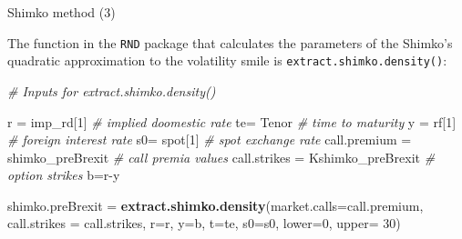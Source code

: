 \documentclass[ignorenonframetext,aspectratio=169]{beamer}
\newenvironment{Shaded}{}{}
\newcommand{\KeywordTok}[1]{\textcolor[rgb]{0.00,0.44,0.13}{\textbf{#1}}}
\newcommand{\DataTypeTok}[1]{\textcolor[rgb]{0.56,0.13,0.00}{#1}}
\newcommand{\DecValTok}[1]{\textcolor[rgb]{0.25,0.63,0.44}{#1}}
\newcommand{\StringTok}[1]{\textcolor[rgb]{0.25,0.44,0.63}{#1}}
\newcommand{\CommentTok}[1]{\textcolor[rgb]{0.38,0.63,0.69}{\textit{#1}}}
\newcommand{\OperatorTok}[1]{\textcolor[rgb]{0.40,0.40,0.40}{#1}}
\newcommand{\NormalTok}[1]{#1}
\begin{document}
\begin{frame}[fragile]{Shimko method (3)}

The function in the \texttt{RND} package that calculates the parameters
of the Shimko's quadratic approximation to the volatility smile is
\texttt{extract.shimko.density()}:

\begin{Shaded}
\begin{Highlighting}[]
\CommentTok{# Inputs for extract.shimko.density()}

\NormalTok{r =}\StringTok{ }\NormalTok{imp_rd[}\DecValTok{1}\NormalTok{]                      }\CommentTok{# implied doomestic rate}
\NormalTok{te=}\StringTok{ }\NormalTok{Tenor                          }\CommentTok{# time to  maturity}
\NormalTok{y =}\StringTok{ }\NormalTok{rf[}\DecValTok{1}\NormalTok{]                          }\CommentTok{# foreign interest rate}
\NormalTok{s0=}\StringTok{ }\NormalTok{spot[}\DecValTok{1}\NormalTok{]                        }\CommentTok{# spot exchange rate}
\NormalTok{call.premium =}\StringTok{ }\NormalTok{shimko_preBrexit    }\CommentTok{# call premia values}
\NormalTok{call.strikes =}\StringTok{ }\NormalTok{Kshimko_preBrexit   }\CommentTok{# option strikes}
\NormalTok{b=r}\OperatorTok{-}\NormalTok{y}

\NormalTok{shimko.preBrexit =}\StringTok{ }\KeywordTok{extract.shimko.density}\NormalTok{(}\DataTypeTok{market.calls=}\NormalTok{call.premium, }
                                          \DataTypeTok{call.strikes =}\NormalTok{ call.strikes,}
                                          \DataTypeTok{r=}\NormalTok{r, }\DataTypeTok{y=}\NormalTok{b, }\DataTypeTok{t=}\NormalTok{te, }\DataTypeTok{s0=}\NormalTok{s0, }
                                          \DataTypeTok{lower=}\DecValTok{0}\NormalTok{, }\DataTypeTok{upper=} \DecValTok{30}\NormalTok{)}
\end{Highlighting}
\end{Shaded}

\end{frame}
\end{document}
